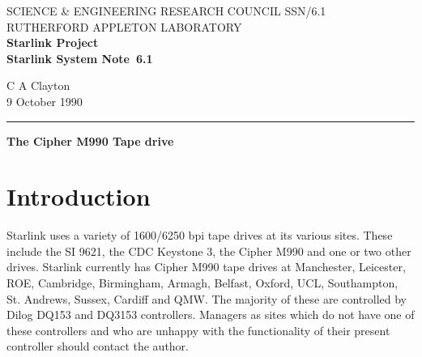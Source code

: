 \pagestyle{myheadings}

\newcommand{\stardoccategory}  {Starlink System Note}
\newcommand{\stardocinitials}  {SSN}
\newcommand{\stardocnumber}    {6.1}
\newcommand{\stardocauthors}   {C A Clayton}
\newcommand{\stardocdate}      {9 October 1990}
\newcommand{\stardoctitle}     {The Cipher M990 Tape drive}

\newcommand{\stardocname}{\stardocinitials /\stardocnumber}
\markright{\stardocname}
\setlength{\textwidth}{160mm}
\setlength{\textheight}{240mm}
\setlength{\topmargin}{-5mm}
\setlength{\oddsidemargin}{0mm}
\setlength{\evensidemargin}{0mm}
\setlength{\parindent}{0mm}
\setlength{\parskip}{\medskipamount}
\setlength{\unitlength}{1mm}


\thispagestyle{empty}
SCIENCE \& ENGINEERING RESEARCH COUNCIL \hfill \stardocname\\
RUTHERFORD APPLETON LABORATORY\\
{\large\bf Starlink Project\\}
{\large\bf \stardoccategory\ \stardocnumber}
\begin{flushright}
\stardocauthors\\
\stardocdate
\end{flushright}
\vspace{-4mm}
\rule{\textwidth}{0.5mm}
\vspace{5mm}
\begin{center}
{\Large\bf \stardoctitle}
\end{center}
\vspace{5mm}

\section{Introduction}

Starlink uses a variety of 1600/6250 bpi tape drives at its various sites.
These include the SI 9621, the CDC Keystone 3, the Cipher M990 and one or two
other drives. 
Starlink currently has Cipher M990 tape drives at Manchester, Leicester, ROE,
Cambridge, Birmingham, Armagh, Belfast, Oxford, UCL, Southampton, St. Andrews,
Sussex, Cardiff and QMW. The majority of these are controlled by Dilog DQ153
and DQ3153 controllers. Managers as 
sites which do not have one of these controllers and who
are unhappy with the functionality of their present controller should contact
the author.

